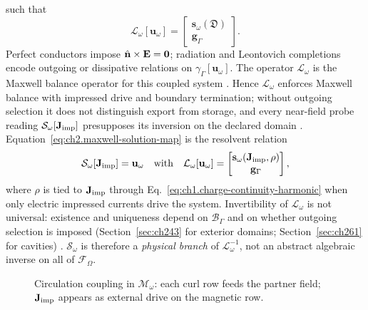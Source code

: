 such that
\begin{equation}
\label{eq:ch2.closed-maxwell-bvp}
\mathcal{L}_\omega[\mathbf{u}_\omega]=
\begin{bmatrix}\mathbf{s}_\omega(\mathfrak{D})\\ \mathbf{g}_\Gamma\end{bmatrix}.
\end{equation}
Perfect conductors impose \(\hat{\mathbf{n}}\times\mathbf{E}=\mathbf{0}\); radiation and
Leontovich completions encode outgoing or dissipative relations on
\(\gamma_\Gamma[\mathbf{u}_\omega]\). The operator \(\mathcal{L}_\omega\) is the
Maxwell balance operator for this coupled system \cite{harrington2001}.
Hence $\mathcal{L}_\omega$ enforces Maxwell balance with impressed drive and boundary termination; without outgoing selection it does not distinguish export from storage, and every near-field probe reading $\mathcal{S}_\omega[\mathbf{J}_{\mathrm{imp}}]$ presupposes its inversion on the declared domain \cite{stratton1941}.
Equation~\eqref{eq:ch2.maxwell-solution-map} is the resolvent relation
\begin{equation}
\label{eq:ch2.solution-map-resolvent}
\mathcal{S}_\omega[\mathbf{J}_{\mathrm{imp}}]=\mathbf{u}_\omega
\quad\text{with}\quad
\mathcal{L}_\omega[\mathbf{u}_\omega]=
\begin{bmatrix}\mathbf{s}_\omega(\mathbf{J}_{\mathrm{imp}},\rho)\\ \mathbf{g}_\Gamma\end{bmatrix},
\end{equation}
where \(\rho\) is tied to \(\mathbf{J}_{\mathrm{imp}}\) through
Eq.~\eqref{eq:ch1.charge-continuity-harmonic} when only electric impressed currents
drive the system. Invertibility of \(\mathcal{L}_\omega\) is not universal: existence
and uniqueness depend on \(\mathcal{B}_\Gamma\) and on whether outgoing selection is
imposed (Section~\ref{sec:ch243} for exterior domains; Section~\ref{sec:ch261} for
cavities) \cite{stratton1941}. \(\mathcal{S}_\omega\) is therefore a \emph{physical
branch} of \(\mathcal{L}_\omega^{-1}\), not an abstract algebraic inverse on all of
\(\mathcal{F}_\Omega\). \begin{figure}[t]
\centering
{}
\caption{Circulation coupling in \(\mathcal{M}_\omega\): each curl row feeds the
partner field; \(\mathbf{J}_{\mathrm{imp}}\) appears as external drive on the magnetic row.}
\label{fig:ch2.first-order-curl-coupling}
\end{figure}
